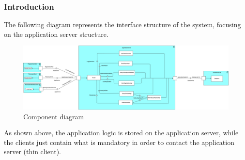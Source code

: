 \subsubsection{Introduction}
The following diagram represents the interface structure of the system, focusing on the application server structure. \newline
\begin{figure}[h!]
	\centering
	\includegraphics[width=\textwidth]{Images/component_diagram_beta}
	\caption{Component diagram}
\end{figure}

As shown above, the application logic is stored on the application server, while the clients just contain what is mandatory in order to contact the application server (thin client).\\
